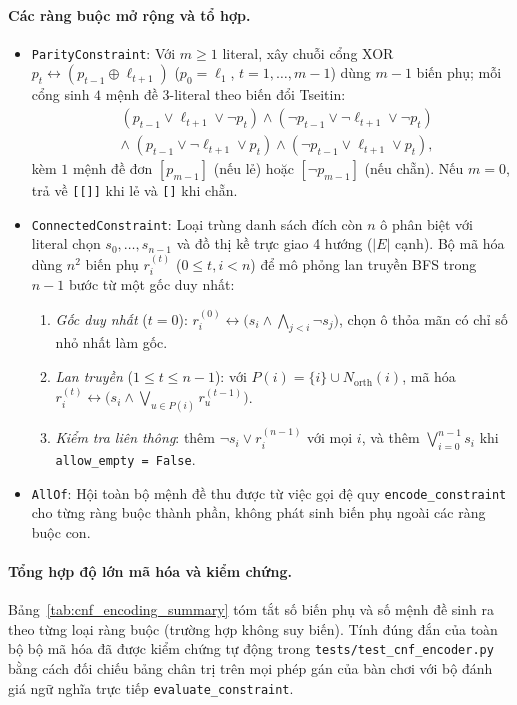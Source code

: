 \paragraph{Các ràng buộc mở rộng và tổ hợp.}
\begin{itemize}
    \item \texttt{ParityConstraint}: Với $m \ge 1$ literal, xây chuỗi cổng XOR $p_t \leftrightarrow (p_{t-1} \oplus \ell_{t+1})$ ($p_0 = \ell_1$, $t = 1, \dots, m - 1$) dùng $m - 1$ biến phụ; mỗi cổng sinh $4$ mệnh đề 3-literal theo biến đổi Tseitin:
    \begin{align*}
        &(p_{t-1} \lor \ell_{t+1} \lor \neg p_t) \land (\neg p_{t-1} \lor \neg \ell_{t+1} \lor \neg p_t) \\
        &\land\; (p_{t-1} \lor \neg \ell_{t+1} \lor p_t) \land (\neg p_{t-1} \lor \ell_{t+1} \lor p_t),
    \end{align*}
    kèm $1$ mệnh đề đơn $[p_{m-1}]$ (nếu lẻ) hoặc $[\neg p_{m-1}]$ (nếu chẵn). Nếu $m = 0$, trả về \texttt{[[]]} khi lẻ và \texttt{[]} khi chẵn.
    \item \texttt{ConnectedConstraint}: Loại trùng danh sách đích còn $n$ ô phân biệt với literal chọn $s_0, \dots, s_{n-1}$ và đồ thị kề trực giao 4 hướng ($|E|$ cạnh). Bộ mã hóa dùng $n^2$ biến phụ $r^{(t)}_i$ ($0 \le t, i < n$) để mô phỏng lan truyền BFS trong $n - 1$ bước từ một gốc duy nhất:
    \begin{enumerate}
        \item \emph{Gốc duy nhất} ($t = 0$): $r^{(0)}_i \leftrightarrow \bigl(s_i \land \bigwedge_{j < i} \neg s_j\bigr)$, chọn ô thỏa mãn có chỉ số nhỏ nhất làm gốc.
        \item \emph{Lan truyền} ($1 \le t \le n - 1$): với $P(i) = \{i\} \cup N_{\text{orth}}(i)$, mã hóa $r^{(t)}_i \leftrightarrow \bigl(s_i \land \bigvee_{u \in P(i)} r^{(t-1)}_u\bigr)$.
        \item \emph{Kiểm tra liên thông}: thêm $\neg s_i \lor r^{(n-1)}_i$ với mọi $i$, và thêm $\bigvee_{i=0}^{n-1} s_i$ khi \texttt{allow\_empty = False}.
    \end{enumerate}
    \item \texttt{AllOf}: Hội toàn bộ mệnh đề thu được từ việc gọi đệ quy \texttt{encode\_constraint} cho từng ràng buộc thành phần, không phát sinh biến phụ ngoài các ràng buộc con.
\end{itemize}

\paragraph{Tổng hợp độ lớn mã hóa và kiểm chứng.}
Bảng~\ref{tab:cnf_encoding_summary} tóm tắt số biến phụ và số mệnh đề sinh ra theo từng loại ràng buộc (trường hợp không suy biến). Tính đúng đắn của toàn bộ bộ mã hóa đã được kiểm chứng tự động trong \texttt{tests/test\_cnf\_encoder.py} bằng cách đối chiếu bảng chân trị trên mọi phép gán của bàn chơi với bộ đánh giá ngữ nghĩa trực tiếp \texttt{evaluate\_constraint}.

